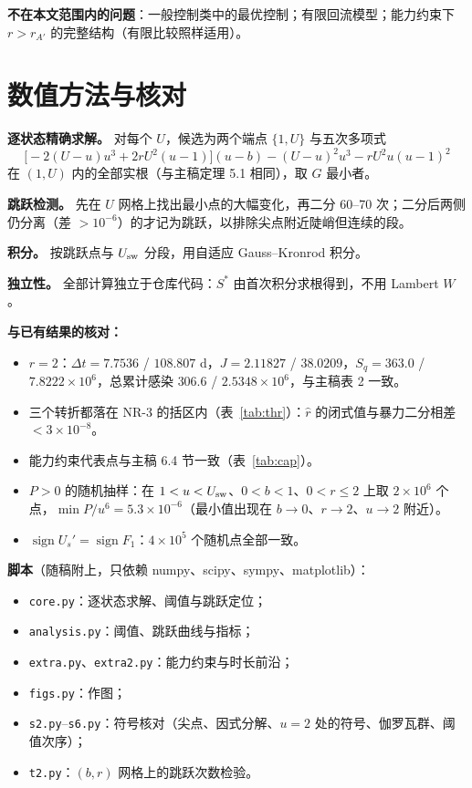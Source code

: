 \documentclass[11pt,a4paper]{ctexart}
\theoremstyle{definition}
\theoremstyle{definition}
\newcommand{\Usw}{U_{\rm sw}}
\newcommand{\rA}{r_{A'}}
\newcommand{\rhat}{\hat r}
\begin{document}
\textbf{不在本文范围内的问题}：一般控制类中的最优控制；有限回流模型；能力约束下 $r>\rA$ 的完整结构（有限比较照样适用）。

\appendix
\section{数值方法与核对}
\label{app:method}

\textbf{逐状态精确求解。} 对每个 $U$，候选为两个端点 $\{1,U\}$ 与五次多项式
\[
\bigl[-2(U-u)u^3+2rU^2(u-1)\bigr](u-b)-(U-u)^2u^3-rU^2u(u-1)^2
\]
在 $(1,U)$ 内的全部实根（与主稿定理 5.1 相同），取 $G$ 最小者。

\textbf{跳跃检测。} 先在 $U$ 网格上找出最小点的大幅变化，再二分 60–70 次；二分后两侧仍分离（差 $>10^{-6}$）的才记为跳跃，以排除尖点附近陡峭但连续的段。

\textbf{积分。} 按跳跃点与 $\Usw$ 分段，用自适应 Gauss–Kronrod 积分。

\textbf{独立性。} 全部计算独立于仓库代码：$S^*$ 由首次积分求根得到，不用 Lambert $W$。

\textbf{与已有结果的核对：}
\begin{itemize}
\item $r=2$：$\Delta t=7.7536$ / $108.807$ d，$J=2.11827$ / $38.0209$，$S_q=363.0$ / $7.8222\times10^6$，总累计感染 $306.6$ / $2.5348\times10^6$，与主稿表 2 一致。
\item 三个转折都落在 NR-3 的括区内（表~\ref{tab:thr}）：$\rhat$ 的闭式值与暴力二分相差 $<3\times10^{-8}$。
\item 能力约束代表点与主稿 6.4 节一致（表~\ref{tab:cap}）。
\item $P>0$ 的随机抽样：在 $1<u<\Usw$、$0<b<1$、$0<r\le2$ 上取 $2\times10^6$ 个点，$\min P/u^6=5.3\times10^{-6}$（最小值出现在 $b\to0$、$r\to2$、$u\to2$ 附近）。
\item $\operatorname{sign}U_s'=\operatorname{sign}F_1$：$4\times10^5$ 个随机点全部一致。
\end{itemize}

\textbf{脚本}（随稿附上，只依赖 numpy、scipy、sympy、matplotlib）：
\begin{itemize}
\item \texttt{core.py}：逐状态求解、阈值与跳跃定位；
\item \texttt{analysis.py}：阈值、跳跃曲线与指标；
\item \texttt{extra.py}、\texttt{extra2.py}：能力约束与时长前沿；
\item \texttt{figs.py}：作图；
\item \texttt{s2.py}–\texttt{s6.py}：符号核对（尖点、因式分解、$u=2$ 处的符号、伽罗瓦群、阈值次序）；
\item \texttt{t2.py}：$(b,r)$ 网格上的跳跃次数检验。
\end{itemize}
\end{document}

